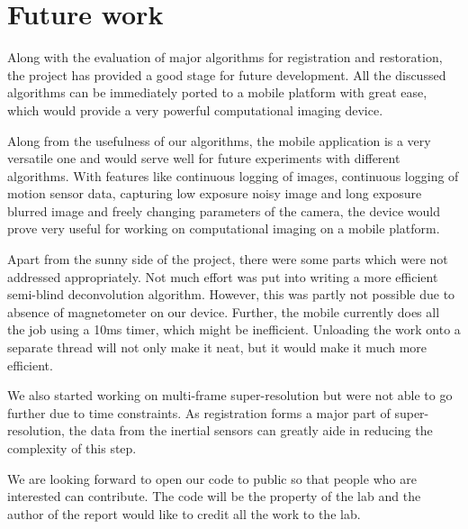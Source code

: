\documentclass[BTech]{iitmdiss}
\begin{document}
\section{Future work}
Along with the evaluation of major algorithms for registration and 
restoration, the project has provided a good stage for future development.
All the discussed algorithms can be immediately ported to a mobile 
platform with great ease, which would provide a very powerful 
computational imaging device.

Along from the usefulness of our algorithms, the mobile application is a
very versatile one and would serve well for future experiments with 
different algorithms. With features like continuous logging of images, 
continuous logging of motion sensor data, capturing low exposure noisy 
image and long exposure blurred image and freely changing parameters of 
the camera, the device would prove very useful for working on 
computational imaging on a mobile platform. 

Apart from the sunny side of the project, there were some parts which 
were not addressed appropriately. Not much effort was put into writing 
a more efficient semi-blind deconvolution algorithm. However, this was
partly not possible due to absence of magnetometer on our device. Further,
the mobile currently does all the job using a 10ms timer, which might
be inefficient. Unloading the work onto a separate thread will not only
make it neat, but it would make it much more efficient. 

We also started working on multi-frame super-resolution but were not able
to go further due to time constraints. As registration
forms a major part of super-resolution, the data from the inertial
 sensors can greatly aide in reducing the complexity of this step. 

We are looking forward to open our code to public so that people who are
interested can contribute. The code will be the property of the lab and 
the author of the report would like to credit all the work to the lab.
\pagebreak


\begin{singlespacing}
	\nocite{*}
	
\end{singlespacing}
\end{document}
